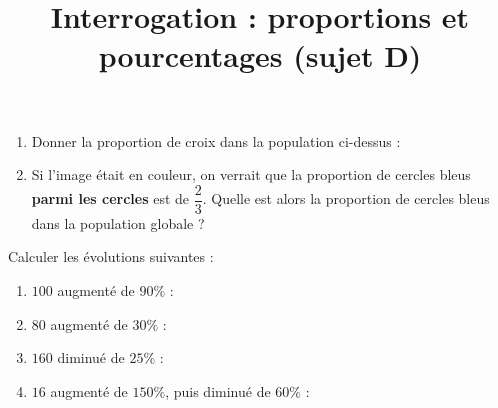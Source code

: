 \documentclass[
	classe=$2^{de}$,
	landscape,
	twocolumn,
	headerTitle={Interrogation 15 min.}
]{évaluation}
\begin{document}
\newpage
\setcounter{exercice}{1}

\title{Interrogation : proportions et pourcentages (sujet D)}
\maketitle

\begin{exercice}
	\begin{center}
	\end{center}

	\begin{enumerate}
		\item Donner la proportion de croix dans la population ci-dessus : 
		\item Si l'image était en couleur, on verrait que la proportion de cercles bleus \textbf{parmi les cercles} est de $\dfrac{2}{3}$. Quelle est alors la proportion de cercles bleus dans la population globale ? 
	\end{enumerate}
\end{exercice}

\begin{exercice}
	Calculer les évolutions suivantes :
	\begin{enumerate}
		\item $100$ augmenté de $90\%$ : 
		\item $80$ augmenté de $30\%$ : 
		\item $160$ diminué de $25\%$ : 
		\item $16$ augmenté de $150\%$, puis diminué de $60\%$ : 
	\end{enumerate}
\end{exercice}
\end{document}
